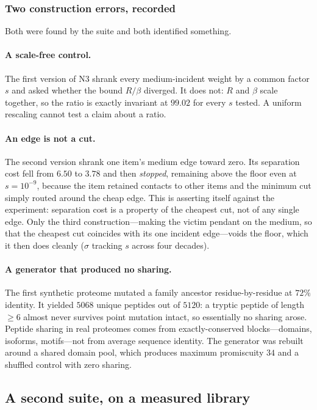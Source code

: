 \documentclass[11pt,a4paper]{article}
\theoremstyle{definition}
\theoremstyle{remark}
\newcommand{\flo}{\beta}                     %
\newcommand{\sep}{\sigma}                    %
\newcommand{\resid}{R}                       %
\begin{document}
\subsubsection{Two construction errors, recorded}

Both were found by the suite and both identified something.

\paragraph{A scale-free control.} The first version of N3 shrank every
medium-incident weight by a common factor $s$ and asked whether the
bound $\resid/\flo$ diverged. It does not: $\resid$ and $\flo$ scale
together, so the ratio is exactly invariant at $99.02$ for every $s$
tested. A uniform rescaling cannot test a claim about a ratio.

\paragraph{An edge is not a cut.} The second version shrank one item's
medium edge toward zero. Its separation cost fell from $6.50$ to $3.78$
and then \emph{stopped}, remaining above the floor even at
$s=10^{-9}$, because the item retained contacts to other items and the
minimum cut simply routed around the cheap edge. This is
 asserting itself against the experiment: separation
cost is a property of the cheapest cut, not of any single edge. Only
the third construction---making the victim pendant on the medium, so
that the cheapest cut coincides with its one incident edge---voids the
floor, which it then does cleanly ($\sep$ tracking $s$ across four
decades).

\paragraph{A generator that produced no sharing.} The first synthetic
proteome mutated a family ancestor residue-by-residue at $72\%$
identity. It yielded $5068$ unique peptides out of $5120$: a tryptic
peptide of length $\ge6$ almost never survives point mutation intact, so
essentially no sharing arose. Peptide sharing in real proteomes comes
from exactly-conserved blocks---domains, isoforms, motifs---not from
average sequence identity. The generator was rebuilt around a shared
domain pool, which produces maximum promiscuity $34$ and a shuffled
control with zero sharing.

\subsection{A second suite, on a measured library}
\end{document}
